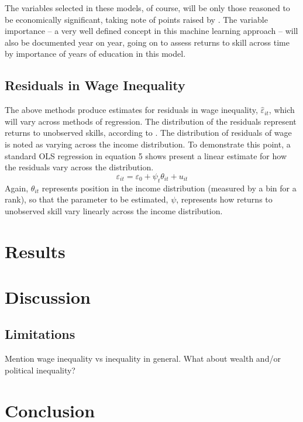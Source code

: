 \documentclass[notitlepage,12pt]{article}
\begin{document}
The variables selected in these models, of course, will be only those reasoned to be economically significant, taking note of points raised by \cite{mullainathan2017machine}.  The variable importance -- a very well defined concept in this machine learning approach -- will also be documented year on year, going on to assess returns to skill across time by importance of years of education in this model. 

\subsection{Residuals in Wage Inequality}
The above methods produce estimates for residuals in wage inequality, $\hat{\varepsilon}_{it}$, which will vary across methods of regression.  The distribution of the residuals represent returns to unobserved skills, according to \cite{juhn1993wage}.  The distribution of residuals of wage is noted as varying across the income distribution.  To demonstrate this point, a standard OLS regression in equation  5 shows present a linear estimate for how the residuals vary across the distribution.
\begin{equation}
\varepsilon_{it} = \varepsilon_{0} + \psi_t \theta_{it} + u_{it}
\end{equation}
Again, $\theta_{it}$ represents position in the income distribution (measured by a bin for a rank), so that the parameter to be estimated, $\psi$, represents how returns to unobserved skill vary linearly across the income distribution.


\section{Results}

\section{Discussion}

\subsection{Limitations}

Mention wage inequality vs inequality in general.  What about wealth and/or political inequality?

\section{Conclusion}



\end{document}

